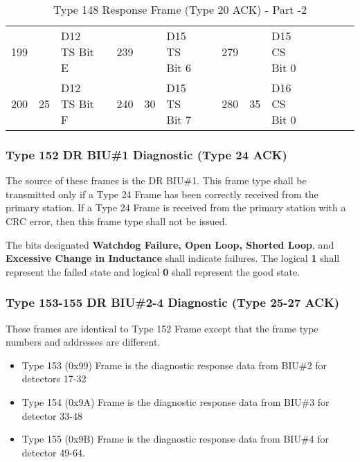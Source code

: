 \documentclass[]{article}
\begin{document}
\begin{landscape}
\begin{table}[]
\begin{tabular}{lllllllllllllll}
			199          &                      & D12 TS Bit E      &                    & 239          &                      & D15 TS Bit 6      &  & 279          &                      & D15 CS Bit 0      &  & \cellcolor[HTML]{EFEFEF} & \cellcolor[HTML]{EFEFEF}                   & \cellcolor[HTML]{EFEFEF} \\
			200          & \multirow{-8}{*}{25} & D12 TS Bit F      &                    & 240          & \multirow{-8}{*}{30} & D15 TS Bit 7      &  & 280          & \multirow{-8}{*}{35} & D16 CS Bit 0      &  & \cellcolor[HTML]{EFEFEF} & \multirow{-8}{*}{\cellcolor[HTML]{EFEFEF}} & \cellcolor[HTML]{EFEFEF} \\ \cline{1-3} \cline{5-7} \cline{9-11} \cline{13-15} 
		\end{tabular}
		\caption{Type 148 Response Frame (Type 20 ACK) - Part -2}
		\label{tab:type-148-frame-part-2}
	\end{table}
\end{landscape}

\subsubsection {Type 152 DR BIU\#1 Diagnostic (Type 24 ACK)}

The source of these frames is the DR BIU\#1. This frame type shall be transmitted only if a Type 24 Frame has been correctly received from the primary station. If a Type 24 Frame is received from the primary station with a CRC error, then this frame type shall not be issued.

The bits designated \textbf{Watchdog Failure, Open Loop, Shorted Loop}, and \textbf{Excessive Change in Inductance} shall indicate failures. The logical \textbf{1} shall represent the failed state and logical \textbf{0} shall represent the good state.

\clearpage

\subsubsection {Type 153-155 DR BIU\#2-4 Diagnostic (Type 25-27 ACK)}

These frames are identical to Type 152 Frame except that the frame type numbers and addresses are different.

\begin{itemize}
	\item Type 153 (0x99) Frame is the diagnostic response data from BIU\#2 for detectors 17-32
	\item Type 154 (0x9A) Frame is the diagnostic response data from BIU\#3 for detector 33-48
	\item Type 155 (0x9B) Frame is the diagnostic response data from BIU\#4 for detector 49-64.
\end{itemize}
\end{document}
